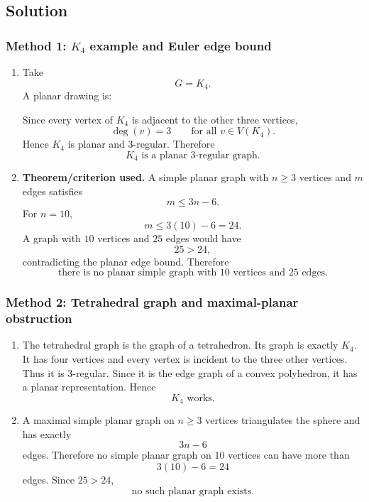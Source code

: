 \documentclass[12pt]{article}
\begin{document}
\subsection{Solution}

\subsubsection{Method 1: $K_4$ example and Euler edge bound}
\begin{enumerate}[label=(\alph*)]
  \item Take
  \[
    G=K_4.
  \]
  A planar drawing is:
  \begin{center}
  \end{center}
  Since every vertex of $K_4$ is adjacent to the other three vertices,
  \[
    \deg(v)=3
    \qquad
    \text{for all }v\in V(K_4).
  \]
  Hence $K_4$ is planar and $3$-regular. Therefore
  \[
    \boxed{K_4\text{ is a planar }3\text{-regular graph}.}
  \]

  \item \textbf{Theorem/criterion used.} A simple planar graph with $n\ge 3$ vertices and $m$ edges satisfies
  \[
    m\le 3n-6.
  \]
  For $n=10$,
  \[
    m\le 3(10)-6=24.
  \]
  A graph with $10$ vertices and $25$ edges would have
  \[
    25>24,
  \]
  contradicting the planar edge bound. Therefore
  \[
    \boxed{\text{there is no planar simple graph with }10\text{ vertices and }25\text{ edges}.}
  \]
\end{enumerate}

\subsubsection{Method 2: Tetrahedral graph and maximal-planar obstruction}
\begin{enumerate}[label=(\alph*)]
  \item The tetrahedral graph is the graph of a tetrahedron. Its graph is exactly $K_4$. It has four vertices and every vertex is incident to the three other vertices. Thus it is $3$-regular. Since it is the edge graph of a convex polyhedron, it has a planar representation. Hence
  \[
    \boxed{K_4\text{ works}.}
  \]

  \item A maximal simple planar graph on $n\ge 3$ vertices triangulates the sphere and has exactly
  \[
    3n-6
  \]
  edges. Therefore no simple planar graph on $10$ vertices can have more than
  \[
    3(10)-6=24
  \]
  edges. Since $25>24$,
  \[
    \boxed{\text{no such planar graph exists}.}
  \]
\end{enumerate}
\end{document}
